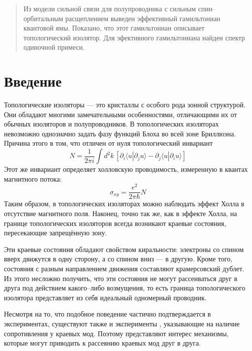 	\newpage
	\begin{abstract}
        Из модели сильной связи для полупроводника с сильным спин--орбитальным
        расщеплением выведен эффективный гамильтониан квантовой ямы.
        Показано, что этот гамильтониан описывает топологический изолятор.
        Для эфективного гамильтониана найден спектр одиночной примеси.
	\end{abstract}
	\section{Введение}
    Топологические изоляторы --- это кристаллы с особого рода зонной структурой.
    Они обладают многими замечательными особенностями, отличающими их от обычных 
    изоляторов и полупроводников. 
    В топологических изоляторах невозможно однозначно задать фазу функций 
    Блоха во всей зоне Бриллюэна. Причина этого в том, что отличен от нуля
    топологический инвариант 
    \begin{equation}
        \label{TKNN}
        N = \frac{1}{2\pi i} 
            \int d^2 k\, \left[\partial_i \langle u | \partial_j u \rangle -
            \partial_j \langle u | \partial_i u \rangle \right]
    \end{equation}
    Этот же инвариант определяет холловскую проводимость, измеренную в квантах 
    магнитного потока:
    \begin{equation}
        \sigma_{xy} = \frac{e^2}{2\pi \hbar} N
    \end{equation}
    Таким образом, в топологических изоляторах можно наблюдать эффект Холла в 
    отсутствие магнитного поля. Наконец, точно так же, как в эффекте Холла, 
    на границе топологических изоляторов всегда возникают краевые состояния,
    пересекающие запрещённую зону.

    Эти краевые состояния обладают свойством киральности: электроны со спином 
    вверх движутся в одну сторону, а со спином вниз --- в другую. Кроме того, состояния 
    с разным направлением движения составляют крамерсовский дублет. Из этого 
    несложно получить, что эти состояния не могут рассеиваться друг в друга 
    под действием какого--либо возмущения, то есть граница топологического 
    изолятора представляет из себя идеальный одномерный проводник.

    Несмотря на то, что подобное поведение частично подтверждается в экспериментах,
    существуют также и эксперименты \cite{Gusev2011}, указывающие на наличие сопротивления
    у краевых мод. Поэтому представляют интерес механизмы, которые могут приводить
    к рассеянию краевых мод друг в друга.

